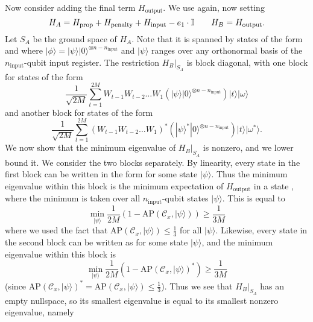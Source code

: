 \documentclass[../thesis-main/thesis-main]{subfiles}
\begin{document}
Now consider adding the final term $H_{\mathrm{output}}$. We use  again, now setting 
\begin{equation}
H_{A}=H_{\text{prop}}+H_{\mathrm{penalty}}+H_{\mathrm{input}}-e_{1}\cdot\mathbb{I}\qquad H_{B}=H_{\mathrm{output}}.
\end{equation}
Let $S_{A}$ be the ground space of $H_{A}$. Note that it is spanned by states of the form  and  where $|\phi\rangle=|\psi\rangle|0\rangle^{\otimes n-n_{\text{input}}}$ and $|\psi\rangle$ ranges over any orthonormal basis of the $n_{\text{input}}$-qubit input register. The restriction $H_{B}|_{S_{A}}$ is block diagonal, with one block for states of the form 
\begin{equation}
\frac{1}{\sqrt{2M}}\sum_{t=1}^{2M}W_{t-1}W_{t-2}\ldots W_{1}\left(|\psi\rangle|0\rangle^{\otimes n-n_{\text{input}}}\right)|t\rangle|\omega\rangle\label{eq:block1}
\end{equation}
and another block for states of the form 
\begin{equation}
\frac{1}{\sqrt{2M}}\sum_{t=1}^{2M}\left(W_{t-1}W_{t-2}\ldots W_{1}\right)^{*}\left(|\psi\rangle^{*}|0\rangle^{\otimes n-n_{\text{input}}}\right)|t\rangle|\omega^{*}\rangle.\label{eq:block2}
\end{equation}
We now show that the minimum eigenvalue of $H_{B}|_{S_{A}}$ is nonzero, and we lower bound it. We consider the two blocks separately. By linearity, every state in the first block can be written in the form  for some state $|\psi\rangle$. Thus the minimum eigenvalue within this block is the minimum expectation of $H_{\text{output}}$ in a state , where the minimum is taken over all $n_{\text{input}}$-qubit states $|\psi\rangle$. This is equal to 
\begin{equation}
\min_{|\psi\rangle}\frac{1}{2M}\left(1-\text{AP}(\mathcal{C}_{x},|\psi\rangle)\right)\geq\frac{1}{3M}
\end{equation}
where we used the fact that $\text{AP}\left(\mathcal{C}_{x},|\psi\rangle\right)\leq\frac{1}{3}$ for all $|\psi\rangle$. Likewise, every state in the second block can be written as  for some state $|\psi\rangle$, and the minimum eigenvalue within this block is 
\begin{equation}
\min_{|\psi\rangle}\frac{1}{2M}\left(1-\text{AP}(\mathcal{C}_{x},|\psi\rangle)^{*}\right)\geq\frac{1}{3M}
\end{equation}
(since $\text{AP}(\mathcal{C}_{x},|\psi\rangle)^{*}=\text{AP}(\mathcal{C}_{x},|\psi\rangle)\leq\frac{1}{3}$). Thus we see that $H_{B}|_{S_{A}}$ has an empty nullspace, so its smallest eigenvalue is equal to its smallest nonzero eigenvalue, namely 
\end{document}
